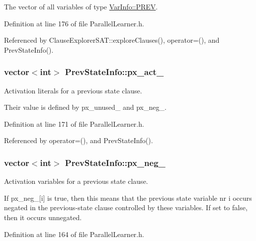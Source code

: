 The vector of all variables of type \hyperlink{classVarInfo_a64d1da76cf84fe674e5fef9764ef11cfa055ef2ea16e83d02bc2b9f2f7f7666df}{Var\-Info\-::\-P\-R\-E\-V}. 



Definition at line 176 of file Parallel\-Learner.\-h.



Referenced by Clause\-Explorer\-S\-A\-T\-::explore\-Clauses(), operator=(), and Prev\-State\-Info().

\hypertarget{classPrevStateInfo_aa135bba641811d2adfc5b2166e3d3772}{
\subsubsection[{px\-\_\-act\-\_\-}]{\setlength{\rightskip}{0pt plus 5cm}vector$<$int$>$ Prev\-State\-Info\-::px\-\_\-act\-\_\-}}\label{classPrevStateInfo_aa135bba641811d2adfc5b2166e3d3772}


Activation literals for a previous state clause. 

Their value is defined by px\-\_\-unused\-\_\- and px\-\_\-neg\-\_\-. 

Definition at line 171 of file Parallel\-Learner.\-h.



Referenced by operator=(), and Prev\-State\-Info().

\hypertarget{classPrevStateInfo_aa7fadcf925ef0176d122b9d7146ccebe}{
\subsubsection[{px\-\_\-neg\-\_\-}]{\setlength{\rightskip}{0pt plus 5cm}vector$<$int$>$ Prev\-State\-Info\-::px\-\_\-neg\-\_\-}}\label{classPrevStateInfo_aa7fadcf925ef0176d122b9d7146ccebe}


Activation variables for a previous state clause. 

If px\-\_\-neg\-\_\-\mbox{[}i\mbox{]} is true, then this means that the previous state variable nr i occurs negated in the previous-\/state clause controlled by these variables. If set to false, then it occurs unnegated. 

Definition at line 164 of file Parallel\-Learner.\-h.



